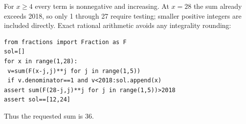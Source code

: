 For $ x\ge4 $ every term is nonnegative and increasing. At $ x=28 $ the sum already exceeds 2018, so only 1 through 27 require testing; smaller positive integers are included directly. Exact rational arithmetic avoids any integrality rounding:
\begin{verbatim}
from fractions import Fraction as F
sol=[]
for x in range(1,28):
 v=sum(F(x-j,j)**j for j in range(1,5))
 if v.denominator==1 and v<2018:sol.append(x)
assert sum(F(28-j,j)**j for j in range(1,5))>2018
assert sol==[12,24]
\end{verbatim}
Thus the requested sum is $\boxed{36}$.
